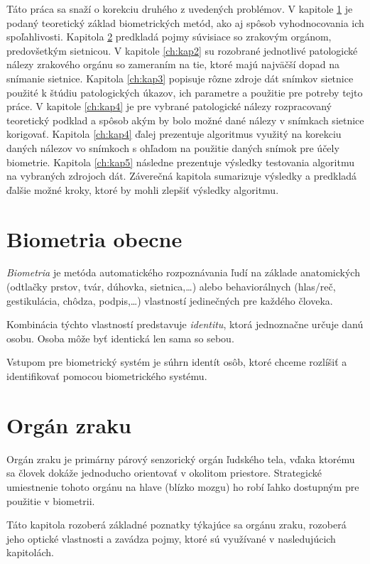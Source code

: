 Táto práca sa snaží o korekciu druhého z uvedených problémov. V kapitole \ref{ch:kap0} je podaný teoretický základ biometrických metód, ako aj spôsob vyhodnocovania ich spoľahlivosti. Kapitola \ref{ch:kap1} predkladá pojmy súvisiace so zrakovým orgánom, predovšetkým sietnicou. V kapitole \ref{ch:kap2} su rozobrané jednotlivé patologické nálezy zrakového orgánu so zameraním na tie, ktoré majú najväčší dopad na snímanie sietnice. Kapitola \ref{ch:kap3} popisuje rôzne zdroje dát snímkov sietnice použité k štúdiu patologických úkazov, ich parametre a použitie pre potreby tejto práce. V kapitole \ref{ch:kap4} je pre vybrané patologické nálezy rozpracovaný teoretický podklad a spôsob akým by bolo možné dané nálezy v snímkach sietnice korigovať. Kapitola \ref{ch:kap4} ďalej prezentuje algoritmus využitý na korekciu daných nálezov vo snímkoch s ohľadom na použitie daných snímok pre účely biometrie. Kapitola \ref{ch:kap5} následne prezentuje výsledky testovania algoritmu na vybraných zdrojoch dát. Záverečná kapitola sumarizuje výsledky a predkladá ďalšie možné kroky, ktoré by mohli zlepšiť výsledky algoritmu.

\chapter{Biometria obecne}\label{ch:kap0}
\emph{Biometria} je metóda automatického rozpoznávania ľudí na základe anatomických (odtlačky prstov, tvár, dúhovka, sietnica,\dots) alebo behaviorálnych (hlas/reč, gestikulácia, chôdza, podpis,\dots) vlastností jedinečných pre každého človeka.

Kombinácia týchto vlastností predstavuje \emph{identitu}, ktorá jednoznačne určuje danú osobu. Osoba môže byť identická len sama so sebou\cite{bio}.

Vstupom pre biometrický systém je súhrn identít osôb, ktoré chceme rozlíšiť a identifikovať pomocou biometrického systému.

\chapter{Orgán zraku}\label{ch:kap1}
Orgán zraku je primárny párový senzorický orgán ľudského tela, vďaka ktorému sa človek dokáže jednoducho orientovať v okolitom priestore. Strategické umiestnenie tohoto orgánu na hlave (blízko mozgu) ho robí ľahko dostupným pre použitie v biometrii.

Táto kapitola rozoberá základné poznatky týkajúce sa orgánu zraku, rozoberá jeho optické vlastnosti a zavádza pojmy, ktoré sú využívané v nasledujúcich kapitolách.

